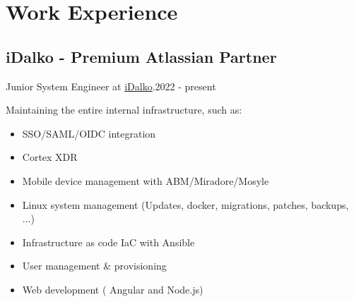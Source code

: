 \section{Work Experie\textcolor{mycolor}{nce}}
  \subsection{iDalko - Premium Atlassian Partner}
    Junior System Engineer at {\href{https://www.idalko.com}{iDalko}}.{\textcolor{mygrey}{\hspace*{\fill}2022 - present}}

    Maintaining the entire internal infrastructure, such as:

    \begin{itemize}
      \item SSO/SAML/OIDC integration
      \item Cortex XDR
      \item Mobile device management with ABM/Miradore/Mosyle
      \item Linux system management (Updates, docker, migrations, patches, backups, ...)
      \item Infrastructure as code IaC with Ansible
      \item User management \& provisioning
      \item Web development ( Angular and Node.js)
    \end{itemize}